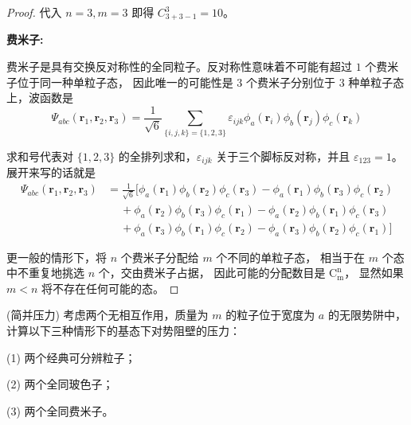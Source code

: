 \begin{proof}
代入 $n=3, m=3$ 即得 $C_{3+3-1}^{3}=10$。

\textbf{费米子:}

费米子是具有交换反对称性的全同粒子。反对称性意味着不可能有超过 $1$ 个费米子位于同一种单粒子态，
因此唯一的可能性是 $3$ 个费米子分别位于 $3$ 种单粒子态上，波函数是
$$\Psi_{a b c}(\mathbf{r}_{1}, \mathbf{r}_{2}, \mathbf{r}_{3})
=\frac{1}{\sqrt{6}} \sum_{\{i, j, k\}=\{1,2,3\}} \varepsilon_{i j k} \phi_{a}(\mathbf{r}_{i}) \phi_{b}(\mathbf{r}_{j}) \phi_{c}(\mathbf{r}_{k})$$

求和号代表对 $\{1,2,3\}$ 的全排列求和，$\varepsilon_{i j k}$ 关于三个脚标反对称，并且 $\varepsilon_{123}=1$。展开来写的话就是
$$\begin{aligned}
\Psi_{a b c}(\mathbf{r}_{1}, \mathbf{r}_{2}, \mathbf{r}_{3})
&= \frac{1}{\sqrt{6}}\big[\phi_{a}(\mathbf{r}_{1}) \phi_{b}(\mathbf{r}_{2}) \phi_{c}(\mathbf{r}_{3})-\phi_{a}(\mathbf{r}_{1}) \phi_{b}(\mathbf{r}_{3}) \phi_{c}(\mathbf{r}_{2}) \\
& \quad\ +\phi_{a}(\mathbf{r}_{2}) \phi_{b}(\mathbf{r}_{3}) \phi_{c}(\mathbf{r}_{1})-\phi_{a}(\mathbf{r}_{2}) \phi_{b}(\mathbf{r}_{1}) \phi_{c}(\mathbf{r}_{3}) \\
& \quad\ +\phi_{a}(\mathbf{r}_{3}) \phi_{b}(\mathbf{r}_{1}) \phi_{c}(\mathbf{r}_{2})-\phi_{a}(\mathbf{r}_{3}) \phi_{b}(\mathbf{r}_{2}) \phi_{c}(\mathbf{r}_{1})\big]
\end{aligned}$$

更一般的情形下，将 $n$ 个费米子分配给 $m$ 个不同的单粒子态，
相当于在 $m$ 个态中不重复地挑选 $n$ 个，交由费米子占据，
因此可能的分配数目是 $\mathrm{C}_{\mathrm{m}}^{\mathrm{n}}$，
显然如果 $m<n$ 将不存在任何可能的态。
\end{proof}
\begin{3}
    (简并压力)  考虑两个无相互作用，质量为 $m$ 的粒子位于宽度为 $a$ 的无限势阱中，计算以下三种情形下的基态下对势阻壁的压力：

(1) 两个经典可分辨粒子；

(2) 两个全同玻色子；

(3) 两个全同费米子。
\end{3}
